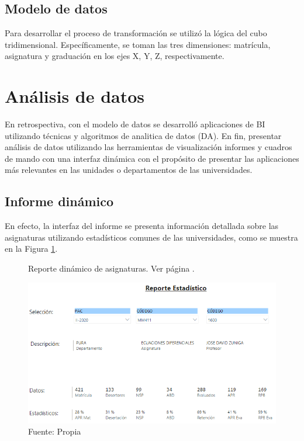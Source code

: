 \documentclass[12pt,jou]{apa7}
\begin{document}
\subsection{Modelo de datos}
Para desarrollar el proceso de transformación se utilizó la lógica del cubo tridimensional. Específicamente, se toman las tres dimensiones: matrícula, asignatura y graduación en los ejes X, Y, Z, respectivamente.


\section{Análisis de datos}
En retrospectiva, con el modelo de datos se desarrolló aplicaciones de BI utilizando técnicas y algoritmos de analitica de datos (DA). En fin, presentar análisis de datos utilizando las herramientas de visualización informes y cuadros de mando con una interfaz dinámica con el propósito de presentar las aplicaciones más relevantes en las unidades o departamentos de las universidades.


\subsection{Informe dinámico}
En efecto, la interfaz del informe se presenta información detallada sobre las asignaturas utilizando estadísticos comunes de las universidades, como se muestra en la Figura \ref{fig: ReporteE}.

\begin{figure}[h]
\caption{Reporte dinámico de asignaturas. Ver página \pageref{ReporteE}.}
\centering
\includegraphics[width=0.9\linewidth]{Figuras/ReporteE}
\caption*{ Fuente: Propia}
\label{fig: ReporteE}
\end{figure}
\end{document}
